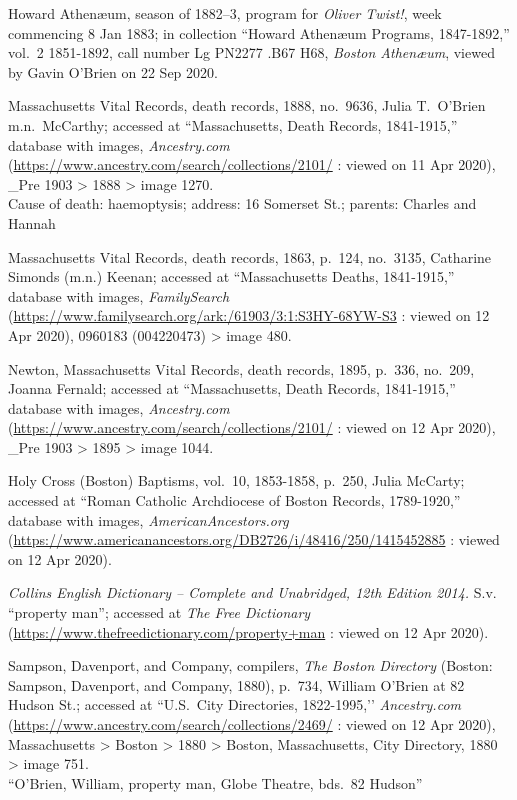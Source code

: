 \begin{thebibliography}{999}
	Howard Athen\ae um, season of 1882--3, program for \textit{Oliver Twist!}, week commencing 8 Jan 1883; in collection ``Howard Athen\ae um Programs, 1847-1892,'' vol.\ 2 1851-1892, call number Lg PN2277 .B67 H68, \textit{Boston Athen\ae um}, viewed by Gavin O'Brien on 22 Sep 2020.
	
	Massachusetts Vital Records, death records, 1888, no.\ 9636, Julia T.\ O'Brien m.n.\ McCarthy; accessed at ``Massachusetts, Death Records, 1841-1915,'' database with images, \textit{Ancestry.com} (\url{https://www.ancestry.com/search/collections/2101/} : viewed on 11 Apr 2020), \_Pre 1903 > 1888 > image 1270.\\
	Cause of death: haemoptysis; address: 16 Somerset St.; parents: Charles and Hannah
	
	Massachusetts Vital Records, death records, 1863, p.\ 124, no.\ 3135, Catharine Simonds (m.n.) Keenan; accessed at ``Massachusetts Deaths, 1841-1915,'' database with images, \textit{FamilySearch} (\url{https://www.familysearch.org/ark:/61903/3:1:S3HY-68YW-S3} : viewed on 12 Apr 2020), 0960183 (004220473) > image 480.
	
	Newton, Massachusetts Vital Records, death records, 1895, p.\ 336, no.\ 209, Joanna Fernald; accessed at ``Massachusetts, Death Records, 1841-1915,'' database with images, \textit{Ancestry.com} (\url{https://www.ancestry.com/search/collections/2101/} : viewed on 12 Apr 2020), \_Pre 1903 > 1895 > image 1044.
	
	Holy Cross (Boston) Baptisms, vol.\ 10, 1853-1858, p.\ 250, Julia McCarty; accessed at ``Roman Catholic Archdiocese of Boston Records, 1789-1920,'' database with images, \textit{AmericanAncestors.org} (\url{https://www.americanancestors.org/DB2726/i/48416/250/1415452885} : viewed on 12 Apr 2020).	
	
	\textit{Collins English Dictionary -- Complete and Unabridged, 12th Edition 2014.} S.v. ``property man''; accessed at \textit{The Free Dictionary} (\url{https://www.thefreedictionary.com/property+man} : viewed on 12 Apr 2020).
	
	Sampson, Davenport, and Company, compilers, \textit{The Boston Directory} (Boston: Sampson, Davenport, and Company, 1880), p.\ 734, William O'Brien at 82 Hudson St.; accessed at ``U.S.\ City Directories, 1822-1995,’’ \textit{Ancestry.com} (\url{https://www.ancestry.com/search/collections/2469/} : viewed on 12 Apr 2020), Massachusetts > Boston > 1880 > Boston, Massachusetts, City Directory, 1880 > image 751.\\
	``O'Brien, William, property man, Globe Theatre, bds.\ 82 Hudson''
	

\end{thebibliography}
